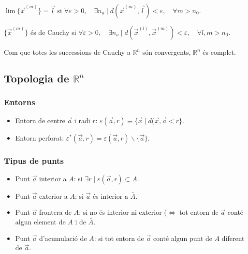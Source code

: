 \begin{defi}
    $\lim \{ \vec{x}^{(m)} \} = \vec{l}$ si $\forall \varepsilon > 0, \quad \exists n_{o} \mid d\left(\vec{x}^{(m)}, \vec{l}\right) < \varepsilon, \quad \forall m > n_{0}$.
\end{defi}

\begin{defi}
    $\{ \vec{x}^{(m)} \}$ és de Cauchy si $\forall \varepsilon > 0, \quad \exists n_{o} \mid d(\vec{x}^{(l)}, \vec{x}^{(m)}) < \varepsilon, \quad \forall l, m > n_{0}$.
    
    Com que totes les successions de Cauchy a $\mathbb{R}^{n}$ són convergents, $\mathbb{R}^{n}$ és complet.
\end{defi}

\subsection{Topologia de $\mathbb{R}^{n}$}
\subsubsection*{Entorns}
\begin{itemize}
    \item Entorn de centre $\vec{a}$ i radi $r$: $\varepsilon (\vec{a}, r) \equiv \{ \vec{x} \mid d(\vec{x}, \vec{a} < r \}$.
    \item Entorn perforat: $\varepsilon^{\ast} (\vec{a}, r) = \varepsilon (\vec{a}, r) \backslash \{ \vec{a} \}$.
\end{itemize}
\subsubsection*{Tipus de punts}
\begin{itemize}
    \item Punt $\vec{a}$ interior a $A$: si $\exists r \mid \varepsilon (\vec{a}, r) \subset A$.
    \item Punt $\vec{a}$ exterior a $A$: si $\vec{a}$ és interior a $\bar{A}$.
    \item Punt $\vec{a}$ frontera de $A$: si no és interior ni exterior ($\Leftrightarrow$ tot entorn de $\vec{a}$ conté algun element de $A$ i de $\bar{A}$.
    \item Punt $\vec{a}$ d'acumulació de $A$: si tot entorn de $\vec{a}$ conté algun punt de $A$ diferent de $\vec{a}$.
\end{itemize}
